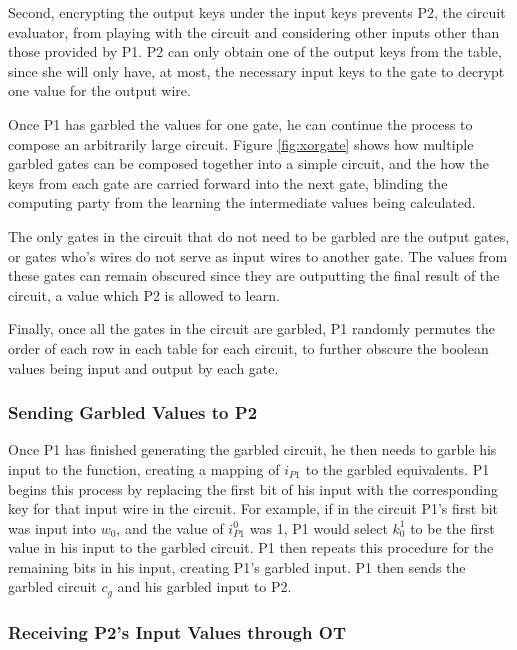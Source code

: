 Second, encrypting the output keys under the input keys prevents \ac{P2}, the circuit evaluator, from playing with the circuit and considering other inputs other than those provided by \ac{P1}. \ac{P2} can only obtain one of the output keys from the table, since she will only have, at most, the necessary input keys to the gate to decrypt one value for the output wire.

Once \ac{P1} has garbled the values for one gate, he can continue the process to compose an arbitrarily large circuit.  Figure \ref{fig:xorgate} shows how multiple garbled gates can be composed together into a simple circuit, and the how the keys from each gate are carried forward into the next gate, blinding the computing party from the learning the intermediate values being calculated.

The only gates in the circuit that do not need to be garbled are the output gates, or gates who's wires do not serve as input wires to another gate.  The values from these gates can remain obscured since they are outputting the final result of the circuit, a value which \ac{P2} is allowed to learn.

Finally, once all the gates in the circuit are garbled, \ac{P1} randomly permutes the order of each row in each table for each circuit, to further obscure the boolean values being input and output by each gate.

\subsubsection{Sending Garbled Values to \ac{P2}}

Once \ac{P1} has finished generating the garbled circuit, he then needs to garble his input to the function, creating a mapping of $i_{P1}$ to the garbled equivalents.  \ac{P1} begins this process by replacing the first bit of his input with the corresponding key for that input wire in the circuit.  For example, if in the circuit \ac{P1}'s first bit was input into $w_0$, and the value of $i^0_{P1}$ was 1, \ac{P1} would select $k^1_0$ to be the first value in his input to the garbled circuit. \ac{P1} then repeats this procedure for the remaining bits in his input, creating \ac{P1}'s garbled input. \ac{P1} then sends the garbled circuit $c_g$ and his garbled input to \ac{P2}.

\subsubsection{Receiving \ac{P2}'s Input Values through \ac{OT}}

